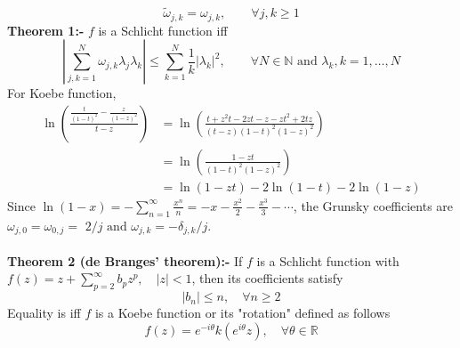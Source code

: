 ﻿\documentclass[12pt,a4paper]{article}
\begin{document}
$$
\widetilde{\omega}_{j, k}=\omega_{j, k}, \qquad \forall j, k \geq 1 
$$
\textbf{Theorem 1:- }$f$ is a Schlicht function iff 
$$
\left|\sum_{j, k=1}^{N} \omega_{j, k} \lambda_{j} \lambda_{k}\right| \leq \sum_{k=1}^{N} \frac{1}{k}\left|\lambda_{k}\right|^{2}, \qquad \forall N\in \mathbb{N} \text{ and } \lambda_{k}, k=1, \ldots, N
$$
For Koebe function,
$$
\begin{aligned}
\ln \left( \frac{\frac{t}{(1-t)^{2}}-\frac{z}{(1-z)^{2}}}{t-z}\right)&=\ln \left( \frac{t+z^{2}t-2zt-z-zt^{2}+2tz}{(t-z)(1-t)^{2}(1-z)^{2}}\right)\\
&=\ln \left( \frac{1-zt}{(1-t)^{2}(1-z)^{2}}\right)\\
&=\ln(1-zt)-2\ln(1-t)-2\ln(1-z)
\end{aligned}
$$
Since $\ln (1-x)=-\sum_{n=1}^{\infty} \frac{x^{n}}{n}=-x-\frac{x^{2}}{2}-\frac{x^{3}}{3}-\cdots$, the Grunsky coefficients are $\omega_{j, 0}=\omega_{0, j}=$ $2 / j \text{ and } \omega_{j, k}=-\delta_{j, k} / j$.\\\\
\textbf{Theorem 2 (de Branges' theorem):- }If $f$ is a Schlicht function with $f(z)=z+\sum_{p=2}^{\infty} b_{p} z^{p}, \quad|z|<1$, then its coefficients satisfy
$$
\left|b_{n}\right| \leq n, \quad \forall n \geq 2
$$
Equality is iff $f$ is a Koebe function or its "rotation" defined as follows
$$
f(z)=e^{-i \theta} k\left(e^{i \theta} z\right), \quad \forall \theta \in \mathbb{R}
$$
\end{document}

